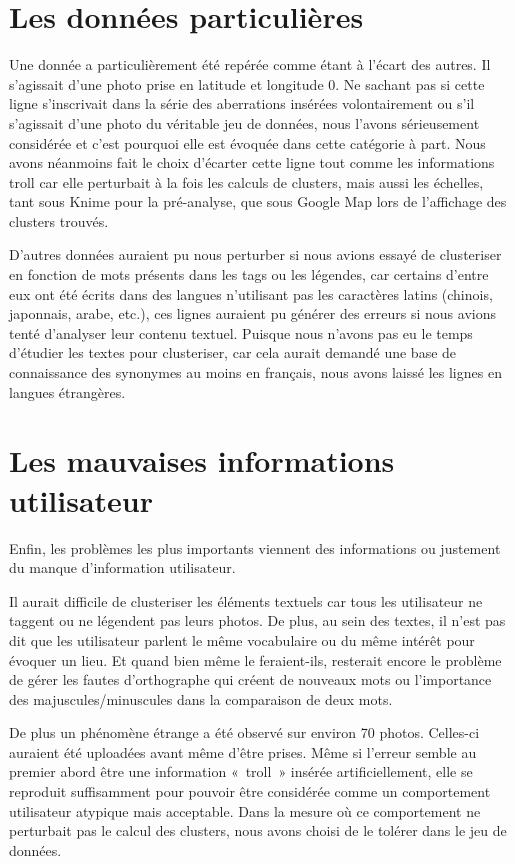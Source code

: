 \section{Les données particulières}
Une donnée a particulièrement été repérée comme étant à l'écart des autres. Il s'agissait d'une photo prise en latitude et longitude 0. Ne sachant pas si cette ligne s'inscrivait dans la série des aberrations insérées volontairement ou s'il s'agissait d'une photo du véritable jeu de données, nous l'avons sérieusement considérée et c'est pourquoi elle est évoquée dans cette catégorie à part.
Nous avons néanmoins fait le choix d'écarter cette ligne tout comme les informations troll car elle perturbait à la fois les calculs de clusters, mais aussi les échelles, tant sous Knime pour la pré-analyse, que sous Google Map lors de l'affichage des clusters trouvés.

D'autres données auraient pu nous perturber si nous avions essayé de clusteriser en fonction de mots présents dans les tags ou les légendes, car certains d'entre eux ont été écrits dans des langues n'utilisant pas les caractères latins (chinois, japonnais, arabe, etc.), ces lignes auraient pu générer des erreurs si nous avions tenté d'analyser leur contenu textuel. Puisque nous n'avons pas eu le temps d'étudier les textes pour clusteriser, car cela aurait demandé une base de connaissance des synonymes au moins en français, nous avons laissé les lignes en langues étrangères.

\section{Les mauvaises informations utilisateur}
Enfin, les problèmes les plus importants viennent des informations ou justement du manque d'information utilisateur.

Il aurait difficile de clusteriser les éléments textuels car tous les utilisateur ne taggent ou ne légendent pas leurs photos. De plus, au sein des textes, il n'est pas dit que les utilisateur parlent le même vocabulaire ou du même intérêt pour évoquer un lieu. Et quand bien même le feraient-ils, resterait encore le problème de gérer les fautes d'orthographe qui créent de nouveaux mots ou l'importance des majuscules/minuscules dans la comparaison de deux mots.

De plus un phénomène étrange a été observé sur environ 70 photos. Celles-ci auraient été uploadées avant même d'être prises. Même si l'erreur semble au premier abord être une information «~troll~» insérée artificiellement, elle se reproduit suffisamment pour pouvoir être considérée comme un comportement utilisateur atypique mais acceptable.
Dans la mesure où ce comportement ne perturbait pas le calcul des clusters, nous avons choisi de le tolérer dans le jeu de données.

